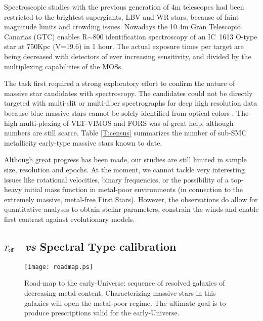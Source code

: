 \documentclass{iau}
\newcommand{\Teff}{\mbox{$T_{\rm eff}$}}
\begin{document}
Spectroscopic studies with the previous generation of 4m telescopes
had been restricted to the brightest supergiants, LBV and WR stars,
because of faint magnitude limits and crowding issues.
Nowadays the 10.4m Gran Telescopio Canarias (GTC)
enables R$\sim$800 identification spectroscopy of an IC~1613 O-type star at 750Kpc (V=19.6) in 1 hour.
The actual exposure times per target are being decreased with detectors of ever increasing sensitivity,
and divided by the multiplexing capabilities of the MOSs.


The task first required a strong exploratory effort
to confirm the nature of massive star candidates with spectroscopy.
The candidates could not be directly targeted with multi-slit or multi-fiber spectrographs
for deep high resolution  data because blue massive stars cannot
be solely identified from optical colors \citep[though some optimized methods for the blue types exist, e.g.][]{GH13a}.
The high multi-plexing of VLT-VIMOS and FORS was of great help, although
numbers are still scarce.
Table \ref{T:census} summarizes the number of sub-SMC metallicity early-type massive stars known to date.

Although great progress has been made, our studies are still limited in sample size, resolution and epochs.
At the moment, we cannot tackle very interesting issues like rotational velocities, binary frequencies,
or the possibility of a top-heavy initial mass function in metal-poor environments
(in connection to the extremely massive, metal-free First Stars).
However, the observations do allow for quantitative analyses to obtain stellar
parameters, constrain the winds and enable first contrast against evolutionary
models. %

\subsection{\Teff~ \textit{vs} Spectral Type calibration}


\begin{figure}[t]
\begin{center}
 \texttt{[image: roadmap.ps]} 
 \caption{Road-map to the early-Universe: sequence of resolved galaxies of decreasing metal content.
   Characterizing massive stars in this galaxies will open the metal-poor regime.
   The ultimate goal is to produce prescriptions valid for the
   early-Universe.
  }
   \label{F:road}
\end{center}
\end{figure}
\end{document}
